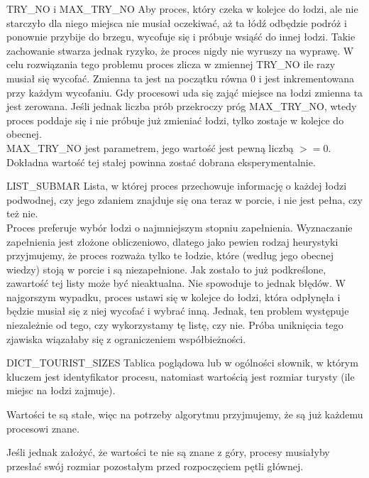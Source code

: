 \documentclass{beamer}
\begin{document}
\begin{frame}{TRY\_NO i MAX\_TRY\_NO}
    \internallinenumbers
    \resetlinenumber[1]
    Aby proces, który czeka w kolejce do łodzi, ale nie starczyło dla niego miejsca nie musiał oczekiwać, aż ta łódź odbędzie podróż i ponownie przybije do brzegu, wycofuje się i próbuje wsiąść do innej łodzi.
    Takie zachowanie stwarza jednak ryzyko, że proces nigdy nie wyruszy na wyprawę. W celu rozwiązania tego problemu proces zlicza w zmiennej TRY\_NO ile razy musiał się wycofać. Zmienna ta jest na początku równa 0 i jest inkrementowana przy każdym wycofaniu. Gdy procesowi uda się zająć miejsce na łodzi zmienna ta jest zerowana. Jeśli jednak liczba prób przekroczy próg MAX\_TRY\_NO, wtedy proces poddaje się i nie próbuje już zmieniać łodzi, tylko zostaje w kolejce do obecnej. \\
    MAX\_TRY\_NO jest parametrem, jego wartość jest pewną liczbą $>=0$. Dokładna wartość tej stałej powinna zostać dobrana eksperymentalnie.
\end{frame}

\begin{frame}{LIST\_SUBMAR}
    \internallinenumbers
    \resetlinenumber[1]
    Lista, w której proces przechowuje informację o każdej łodzi podwodnej, czy jego zdaniem znajduje się ona teraz w porcie, i nie jest pełna, czy też nie. \\
    Proces preferuje wybór łodzi o najmniejszym stopniu zapełnienia. Wyznaczanie zapełnienia jest złożone obliczeniowo, dlatego jako pewien rodzaj heurystyki przyjmujemy, że proces rozważa tylko te łodzie, które (według jego obecnej wiedzy) stoją w porcie i są niezapełnione. 
    Jak zostało to już podkreślone, zawartość tej listy może być nieaktualna. Nie spowoduje to jednak błędów. W najgorszym wypadku, proces ustawi się w kolejce do łodzi, która odpłynęła i będzie musiał się z niej wycofać i wybrać inną. Jednak, ten problem występuje niezależnie od tego, czy wykorzystamy tę listę, czy nie. Próba uniknięcia tego zjawiska wiązałaby się z ograniczeniem współbieżności.
\end{frame}

\begin{frame}{DICT\_TOURIST\_SIZES}
    \internallinenumbers
    \resetlinenumber[1]
    Tablica poglądowa lub w ogólności słownik, w którym kluczem jest identyfikator procesu, natomiast wartością jest rozmiar turysty (ile miejsc na łodzi zajmuje). 

    \vspace{0.4cm}
    Wartości te są stałe, więc na potrzeby algorytmu przyjmujemy, że są już każdemu procesowi znane.

    \vspace{0.4cm}
    Jeśli jednak założyć, że wartości te nie są znane z góry, procesy musiałyby przesłać swój rozmiar pozostałym przed rozpoczęciem pętli głównej.
\end{frame}
\end{document}
